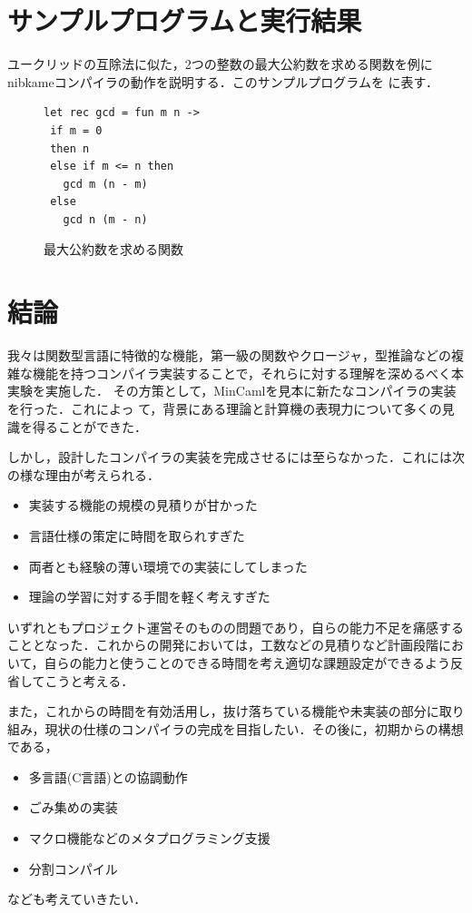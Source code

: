 \documentclass[a4paper,titlepage,report,disablejfam]{jsbook}
\begin{document}
\chapter{サンプルプログラムと実行結果}\label{ch:sample-program}
ユークリッドの互除法に似た，2つの整数の最大公約数を求める関数を例に
nibkameコンパイラの動作を説明する．このサンプルプログラムを
に表す．

\begin{figure}[htb]
\begin{center} 
\begin{lstlisting}
let rec gcd = fun m n ->
 if m = 0
 then n
 else if m <= n then
   gcd m (n - m)
 else
   gcd n (m - n)   
\end{lstlisting}
\caption{最大公約数を求める関数}\label{fig:impl-sample}
\end{center}
\end{figure}

\chapter{結論}\label{ch:conclude}
我々は関数型言語に特徴的な機能，第一級の関数やクロージャ，型推論などの複
雑な機能を持つコンパイラ実装することで，それらに対する理解を深めるべく本
実験を実施した．
その方策として，MinCamlを見本に新たなコンパイラの実装を行った．これによっ
て，背景にある理論と計算機の表現力について多くの見識を得ることができた．

しかし，設計したコンパイラの実装を完成させるには至らなかった．これには次
の様な理由が考えられる．
\begin{itemize}
 \item 実装する機能の規模の見積りが甘かった
 \item 言語仕様の策定に時間を取られすぎた
 \item 両者とも経験の薄い環境での実装にしてしまった
 \item 理論の学習に対する手間を軽く考えすぎた
\end{itemize}

いずれともプロジェクト運営そのものの問題であり，自らの能力不足を痛感する
こととなった．これからの開発においては，工数などの見積りなど計画段階にお
いて，自らの能力と使うことのできる時間を考え適切な課題設定ができるよう反
省してこうと考える．

また，これからの時間を有効活用し，抜け落ちている機能や未実装の部分に取り
組み，現状の仕様のコンパイラの完成を目指したい．その後に，初期からの構想
である，
\begin{itemize}
 \item 多言語(C言語)との協調動作
 \item ごみ集めの実装
 \item マクロ機能などのメタプログラミング支援
 \item 分割コンパイル
\end{itemize}
なども考えていきたい．
\begin{flushright}[文責: 小堀 育男]\end{flushright}
\end{document}

